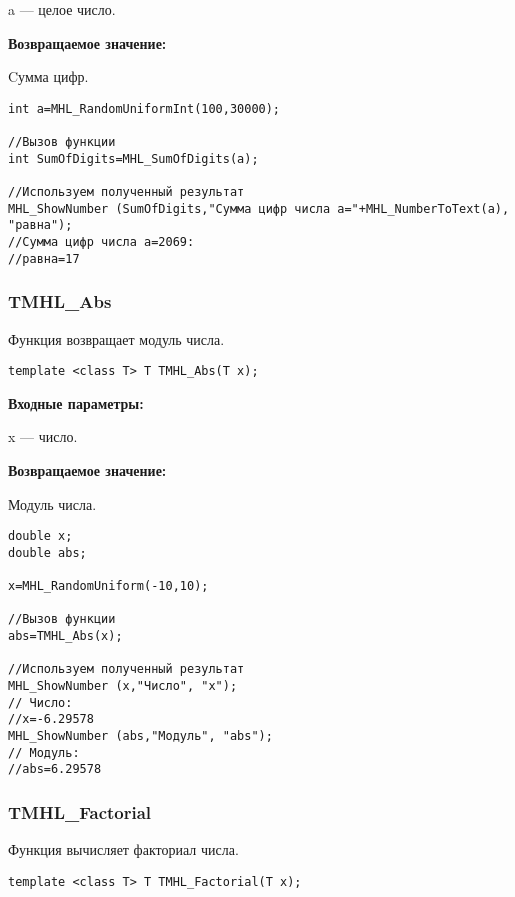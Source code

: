 \documentclass[a4paper,12pt]{article}
\begin{document}
a --- целое число.

\textbf{Возвращаемое значение:}

Cумма цифр.


\begin{lstlisting}[label=code_use_MHL_SumOfDigits,caption=Пример использования]
int a=MHL_RandomUniformInt(100,30000);

//Вызов функции
int SumOfDigits=MHL_SumOfDigits(a);

//Используем полученный результат
MHL_ShowNumber (SumOfDigits,"Сумма цифр числа a="+MHL_NumberToText(a), "равна");
//Сумма цифр числа a=2069:
//равна=17
\end{lstlisting}

\subsubsection{TMHL\_Abs}\label{TMHL_Abs}

Функция возвращает модуль числа.


\begin{lstlisting}[label=code_syntax_TMHL_Abs,caption=Синтаксис]
template <class T> T TMHL_Abs(T x);
\end{lstlisting}

\textbf{Входные параметры:}

 x --- число.
 
\textbf{Возвращаемое значение:}

 Модуль числа.


\begin{lstlisting}[label=code_use_TMHL_Abs,caption=Пример использования]
double x;
double abs;

x=MHL_RandomUniform(-10,10);

//Вызов функции
abs=TMHL_Abs(x);

//Используем полученный результат
MHL_ShowNumber (x,"Число", "x");
// Число:
//x=-6.29578
MHL_ShowNumber (abs,"Модуль", "abs");
// Модуль:
//abs=6.29578
\end{lstlisting}

\subsubsection{TMHL\_Factorial}\label{TMHL_Factorial}

Функция вычисляет факториал числа.


\begin{lstlisting}[label=code_syntax_TMHL_Factorial,caption=Синтаксис]
template <class T> T TMHL_Factorial(T x);
\end{lstlisting}
\end{document}
